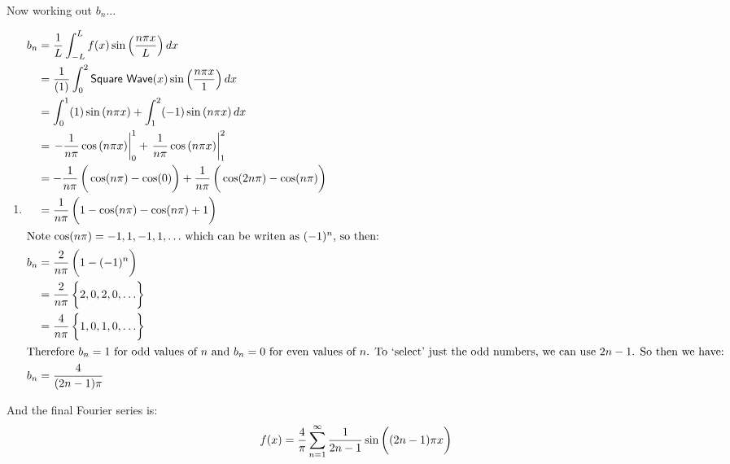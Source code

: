 \documentclass[11pt,letterpaper,twoside]{book}
\newenvironment{mathstuff}
   {\cbcolor{black}\par \vspace{8pt} \cbstart \vspace{-15pt} \begin{enumerate} \item[]}
   {\end{enumerate} \vspace{-5pt} \cbend \par \vspace{7pt} }
\begin{document}
Now working out $b_n$...
\begin{mathstuff}
\begin{align*}
b_n &= \frac{1}{L} \int_{-L}^L f(x) \sin \left( \frac{n\pi x}{L} \right) dx \\
    &= \frac{1}{(1)} \int_0^2 \mathsf{Square\ Wave}(x) \sin \left( \frac{n\pi x}{1} \right) dx \\
    &= \int_0^1 (1) \sin \left( n\pi x \right) + \int_1^2 (-1) \sin \left( n\pi x \right) dx \\
    &= \left. -\frac{1}{n \pi} \cos \left( n\pi x \right)\right|^1_0 + \left. \frac{1}{n \pi} \cos \left( n\pi x \right)\right|^2_1 \\
    &= -\frac{1}{n \pi} \left( \vphantom{\frac{1}{2}} \cos ( n\pi ) - \cos ( 0 ) \right) + \frac{1}{n \pi} \left( \vphantom{\frac{1}{2}} \cos(2n\pi) - \cos(n\pi) \right) \\ 
    &= \frac{1}{n \pi} \left( \vphantom{\frac{1}{2}} 1 - \cos(n\pi) - \cos(n\pi) + 1\right) \\
\intertext{Note $\cos(n\pi) = -1, 1, -1, 1, \ldots$\ which can be writen as $(-1)^n$, so then: }
b_n &= \frac{2}{n \pi} \left( \vphantom{\frac{1}{2}} 1 - (-1)^n \right) \\
    &= \frac{2}{n \pi} \left\{ \vphantom{\frac{1}{2}} 2, 0, 2, 0, \ldots \right\} \\
    &= \frac{4}{n \pi} \left\{ \vphantom{\frac{1}{2}} 1, 0, 1, 0, \ldots \right\} \\
\intertext{Therefore $b_n = 1$ for odd values of $n$ and $b_n = 0$ for even values of $n$.  To `select' just the odd numbers, we can use $2n - 1$.  So then we have:} 
b_n &= \frac{4}{(2n - 1)\pi} 
\end{align*}
\end{mathstuff}

And the final Fourier series is:
\[
f(x) = \frac{4}{\pi} \sum^\infty_{n = 1} \frac{1}{2n - 1} \sin \left( (2n - 1) \pi \vphantom{\frac{1}{2}} x \right)
\]

\lipsum[16-17]
\end{document}
